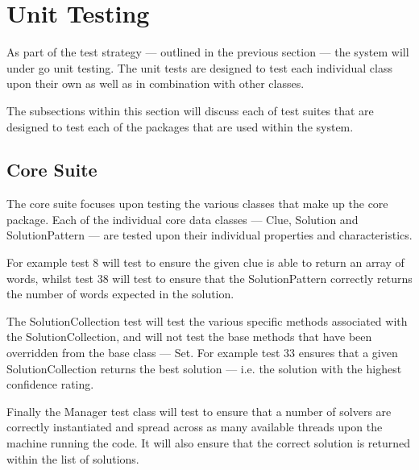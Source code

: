 \section{Unit Testing}
\label{sec:unit_testing}

As part of the test strategy --- outlined in the previous section --- the system
will under go unit testing. The unit tests are designed to test each individual 
class upon their own as well as in combination with other classes.

The subsections within this section will discuss each of test suites that are 
designed to test each of the packages that are used within the system.

\subsection{Core Suite}
\label{sub:test_core_suite}

The core suite focuses upon testing the various classes that make up the core 
package. Each of the individual core data classes --- Clue, Solution and 
SolutionPattern --- are tested upon their individual properties and 
characteristics.

For example test 8 will test to ensure the given clue is able to return an array
of words, whilst test 38 will test to ensure that the SolutionPattern correctly
returns the number of words expected in the solution.

The SolutionCollection test will test the various specific methods associated 
with the SolutionCollection, and will not test the base methods that have been 
overridden from the base class --- Set. For example test 33 ensures that a given
SolutionCollection returns the best solution --- i.e. the solution with the 
highest confidence rating.

Finally the Manager test class will test to ensure that a number of solvers are 
correctly instantiated and spread across as many available threads upon the 
machine running the code. It will also ensure that the correct solution is 
returned within the list of solutions.

